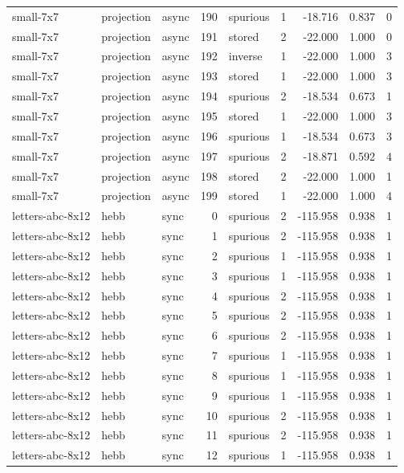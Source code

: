 \begin{tabular}{lllrlrrrr}
small-7x7 & projection & async & 190 & spurious & 1 & -18.716 & 0.837 & 0 \\
small-7x7 & projection & async & 191 & stored & 2 & -22.000 & 1.000 & 0 \\
small-7x7 & projection & async & 192 & inverse & 1 & -22.000 & 1.000 & 3 \\
small-7x7 & projection & async & 193 & stored & 1 & -22.000 & 1.000 & 3 \\
small-7x7 & projection & async & 194 & spurious & 2 & -18.534 & 0.673 & 1 \\
small-7x7 & projection & async & 195 & stored & 1 & -22.000 & 1.000 & 3 \\
small-7x7 & projection & async & 196 & spurious & 1 & -18.534 & 0.673 & 3 \\
small-7x7 & projection & async & 197 & spurious & 2 & -18.871 & 0.592 & 4 \\
small-7x7 & projection & async & 198 & stored & 2 & -22.000 & 1.000 & 1 \\
small-7x7 & projection & async & 199 & stored & 1 & -22.000 & 1.000 & 4 \\
letters-abc-8x12 & hebb & sync & 0 & spurious & 2 & -115.958 & 0.938 & 1 \\
letters-abc-8x12 & hebb & sync & 1 & spurious & 2 & -115.958 & 0.938 & 1 \\
letters-abc-8x12 & hebb & sync & 2 & spurious & 1 & -115.958 & 0.938 & 1 \\
letters-abc-8x12 & hebb & sync & 3 & spurious & 1 & -115.958 & 0.938 & 1 \\
letters-abc-8x12 & hebb & sync & 4 & spurious & 2 & -115.958 & 0.938 & 1 \\
letters-abc-8x12 & hebb & sync & 5 & spurious & 2 & -115.958 & 0.938 & 1 \\
letters-abc-8x12 & hebb & sync & 6 & spurious & 2 & -115.958 & 0.938 & 1 \\
letters-abc-8x12 & hebb & sync & 7 & spurious & 1 & -115.958 & 0.938 & 1 \\
letters-abc-8x12 & hebb & sync & 8 & spurious & 1 & -115.958 & 0.938 & 1 \\
letters-abc-8x12 & hebb & sync & 9 & spurious & 1 & -115.958 & 0.938 & 1 \\
letters-abc-8x12 & hebb & sync & 10 & spurious & 2 & -115.958 & 0.938 & 1 \\
letters-abc-8x12 & hebb & sync & 11 & spurious & 2 & -115.958 & 0.938 & 1 \\
letters-abc-8x12 & hebb & sync & 12 & spurious & 1 & -115.958 & 0.938 & 1 \\

\end{tabular}
